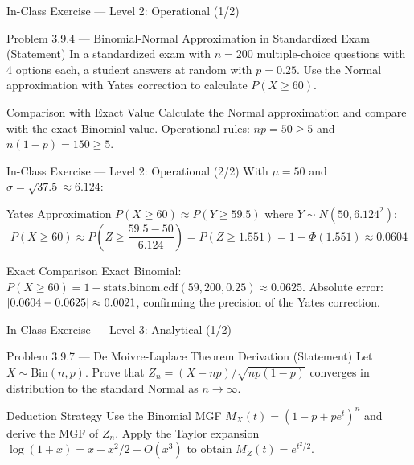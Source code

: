 \documentclass[aspectratio=169,xcolor={dvipsnames,table}]{beamer}
\begin{document}
\begin{frame}{In-Class Exercise --- Level 2: Operational (1/2)}
	\vspace{-0.1cm}
	\begin{block}{Problem 3.9.4 --- Binomial-Normal Approximation in Standardized Exam (Statement)}
		In a standardized exam with $n = 200$ multiple-choice questions with 4 options each, a student answers at random with $p = 0.25$. Use the Normal approximation with Yates correction to calculate $P(X \ge 60)$.
	\end{block}
	\vspace{0.15cm}
	\pause
	\begin{alertblock}{Comparison with Exact Value}
		\scriptsize
		Calculate the Normal approximation and compare with the exact Binomial value. Operational rules: $np = 50 \ge 5$ and $n(1-p) = 150 \ge 5$.
	\end{alertblock}
\end{frame}

\begin{frame}{In-Class Exercise --- Level 2: Operational (2/2)}
	\vspace{-0.05cm}
	\scriptsize
	With $\mu = 50$ and $\sigma = \sqrt{37.5} \approx 6.124$: \pause
	\begin{block}{Yates Approximation}
		\scriptsize
		$P(X \ge 60) \approx P(Y \ge 59.5)$ where $Y \sim N(50, 6.124^{2})$:
		$$P(X \ge 60) \approx P\left(Z \ge \dfrac{59.5 - 50}{6.124}\right) = P(Z \ge 1.551) = 1 - \Phi(1.551) \approx 0.0604$$
	\end{block}
	\vspace{0.05cm}
	\pause
	\begin{alertblock}{Exact Comparison}
		\scriptsize
		Exact Binomial: $P(X \ge 60) = 1 - \text{stats.binom.cdf}(59, 200, 0.25) \approx 0.0625$. Absolute error: $\left|0.0604 - 0.0625\right| \approx 0.0021$, confirming the precision of the Yates correction.
	\end{alertblock}
\end{frame}

\begin{frame}{In-Class Exercise --- Level 3: Analytical (1/2)}
	\vspace{-0.1cm}
	\begin{block}{Problem 3.9.7 --- De Moivre-Laplace Theorem Derivation (Statement)}
		Let $X \sim \text{Bin}(n, p)$. Prove that $Z_{n} = (X - np)/\sqrt{np(1-p)}$ converges in distribution to the standard Normal as $n \to \infty$.
	\end{block}
	\vspace{0.1cm}
	\pause
	\begin{alertblock}{Deduction Strategy}
		\scriptsize
		Use the Binomial MGF $M_{X}(t) = (1 - p + p e^{t})^{n}$ and derive the MGF of $Z_{n}$. Apply the Taylor expansion $\log(1 + x) = x - x^{2}/2 + O(x^{3})$ to obtain $M_{Z}(t) = e^{t^{2}/2}$.
	\end{alertblock}
\end{frame}
\end{document}

